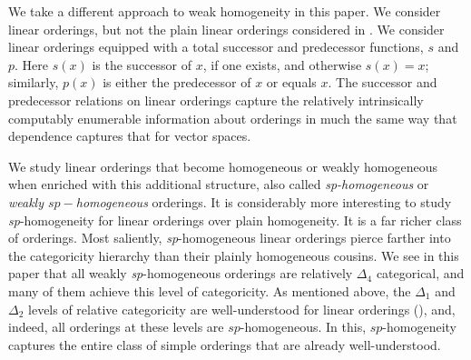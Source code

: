 \documentclass[11pt]{amsart}
\theoremstyle{definition}
\begin{document}
We take a different approach to weak homogeneity in this paper.
We consider linear orderings, but not the plain linear orderings considered in \cite{AC17}.
We consider linear orderings equipped with a total successor and predecessor functions, $s$ and $p$. Here $s(x)$ is the successor of $x$, if one exists, and otherwise $s(x) = x$; similarly, $p(x)$ is either the predecessor of $x$ or equals $x$.  The successor and predecessor relations on linear orderings capture the relatively intrinsically computably enumerable information about orderings in much the same way that dependence captures that for vector spaces. 

We study linear orderings that become homogeneous or weakly homogeneous when enriched with this additional structure, also called \textit{sp-homogeneous} or \textit{weakly $sp-$homogeneous} orderings. It is considerably more interesting to study \textit{sp}-homogeneity for linear orderings over plain homogeneity.
It is a far richer class of orderings.
Most saliently, \textit{sp}-homogeneous linear orderings pierce farther into the categoricity hierarchy than their plainly homogeneous cousins.
We see in this paper that all weakly \textit{sp}-homogeneous orderings are relatively $\Delta_4$ categorical, and many of them achieve this level of categoricity.
As mentioned above, the $\Delta_1$ and $\Delta_2$ levels of relative categoricity are well-understood for linear orderings (\cite{DG1980,Remmel1981, McCoy2002}), and, indeed, all orderings at these levels are $sp$-homogeneous.
In this, $sp$-homogeneity captures the entire class of simple orderings that are already well-understood.
\end{document}
